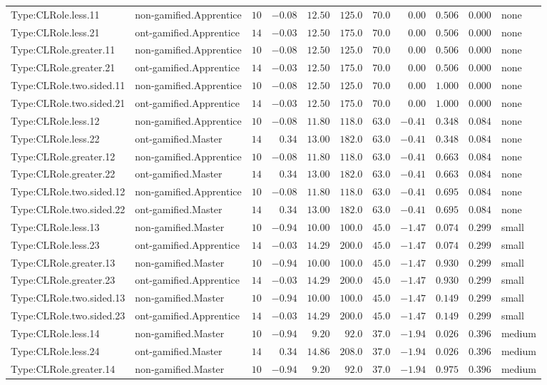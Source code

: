 \documentclass[6pt,a4paper]{article}
\begin{document}
{\begin{longtable}{llrrrrrrrrl}
Type:CLRole.less.11&non-gamified.Apprentice&$10$&$-0.08$&$12.50$&$125.0$&$ 70.0$&$ 0.00$&$0.506$&$0.000$&none\tabularnewline
Type:CLRole.less.21&ont-gamified.Apprentice&$14$&$-0.03$&$12.50$&$175.0$&$ 70.0$&$ 0.00$&$0.506$&$0.000$&none\tabularnewline
Type:CLRole.greater.11&non-gamified.Apprentice&$10$&$-0.08$&$12.50$&$125.0$&$ 70.0$&$ 0.00$&$0.506$&$0.000$&none\tabularnewline
Type:CLRole.greater.21&ont-gamified.Apprentice&$14$&$-0.03$&$12.50$&$175.0$&$ 70.0$&$ 0.00$&$0.506$&$0.000$&none\tabularnewline
Type:CLRole.two.sided.11&non-gamified.Apprentice&$10$&$-0.08$&$12.50$&$125.0$&$ 70.0$&$ 0.00$&$1.000$&$0.000$&none\tabularnewline
Type:CLRole.two.sided.21&ont-gamified.Apprentice&$14$&$-0.03$&$12.50$&$175.0$&$ 70.0$&$ 0.00$&$1.000$&$0.000$&none\tabularnewline
Type:CLRole.less.12&non-gamified.Apprentice&$10$&$-0.08$&$11.80$&$118.0$&$ 63.0$&$-0.41$&$0.348$&$0.084$&none\tabularnewline
Type:CLRole.less.22&ont-gamified.Master&$14$&$ 0.34$&$13.00$&$182.0$&$ 63.0$&$-0.41$&$0.348$&$0.084$&none\tabularnewline
Type:CLRole.greater.12&non-gamified.Apprentice&$10$&$-0.08$&$11.80$&$118.0$&$ 63.0$&$-0.41$&$0.663$&$0.084$&none\tabularnewline
Type:CLRole.greater.22&ont-gamified.Master&$14$&$ 0.34$&$13.00$&$182.0$&$ 63.0$&$-0.41$&$0.663$&$0.084$&none\tabularnewline
Type:CLRole.two.sided.12&non-gamified.Apprentice&$10$&$-0.08$&$11.80$&$118.0$&$ 63.0$&$-0.41$&$0.695$&$0.084$&none\tabularnewline
Type:CLRole.two.sided.22&ont-gamified.Master&$14$&$ 0.34$&$13.00$&$182.0$&$ 63.0$&$-0.41$&$0.695$&$0.084$&none\tabularnewline
Type:CLRole.less.13&non-gamified.Master&$10$&$-0.94$&$10.00$&$100.0$&$ 45.0$&$-1.47$&$0.074$&$0.299$&small\tabularnewline
Type:CLRole.less.23&ont-gamified.Apprentice&$14$&$-0.03$&$14.29$&$200.0$&$ 45.0$&$-1.47$&$0.074$&$0.299$&small\tabularnewline
Type:CLRole.greater.13&non-gamified.Master&$10$&$-0.94$&$10.00$&$100.0$&$ 45.0$&$-1.47$&$0.930$&$0.299$&small\tabularnewline
Type:CLRole.greater.23&ont-gamified.Apprentice&$14$&$-0.03$&$14.29$&$200.0$&$ 45.0$&$-1.47$&$0.930$&$0.299$&small\tabularnewline
Type:CLRole.two.sided.13&non-gamified.Master&$10$&$-0.94$&$10.00$&$100.0$&$ 45.0$&$-1.47$&$0.149$&$0.299$&small\tabularnewline
Type:CLRole.two.sided.23&ont-gamified.Apprentice&$14$&$-0.03$&$14.29$&$200.0$&$ 45.0$&$-1.47$&$0.149$&$0.299$&small\tabularnewline
Type:CLRole.less.14&non-gamified.Master&$10$&$-0.94$&$ 9.20$&$ 92.0$&$ 37.0$&$-1.94$&$0.026$&$0.396$&medium\tabularnewline
Type:CLRole.less.24&ont-gamified.Master&$14$&$ 0.34$&$14.86$&$208.0$&$ 37.0$&$-1.94$&$0.026$&$0.396$&medium\tabularnewline
Type:CLRole.greater.14&non-gamified.Master&$10$&$-0.94$&$ 9.20$&$ 92.0$&$ 37.0$&$-1.94$&$0.975$&$0.396$&medium\tabularnewline

\end{longtable}}
\end{document}
